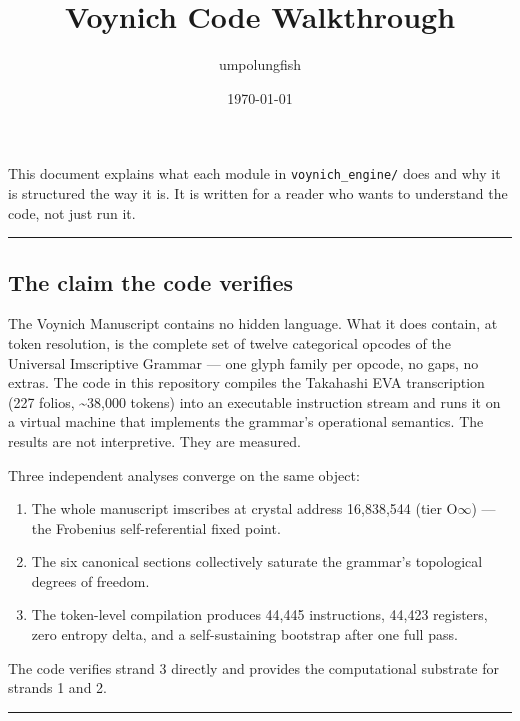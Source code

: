 \documentclass[12pt,a4paper]{article}
\begin{document}
\title{Voynich Code Walkthrough}
\author{umpolungfish}
\date{\today}

\maketitle

This document explains what each module in \texttt{voynich\_engine/} does and why it is structured the way it is. It is written for a reader who wants to understand the code, not just run it.

\begin{center}
\rule{0.5\textwidth}{0.4pt}
\end{center}

\subsection{The claim the code verifies}

The Voynich Manuscript contains no hidden language. What it does contain, at token resolution, is the complete set of twelve categorical opcodes of the Universal Imscriptive Grammar --- one glyph family per opcode, no gaps, no extras. The code in this repository compiles the Takahashi EVA transcription (227 folios, \textasciitilde{}38,000 tokens) into an executable instruction stream and runs it on a virtual machine that implements the grammar's operational semantics. The results are not interpretive. They are measured.

Three independent analyses converge on the same object:

\begin{enumerate}
    \item The whole manuscript imscribes at crystal address 16,838,544 (tier O$\infty$) --- the Frobenius self-referential fixed point.
    \item The six canonical sections collectively saturate the grammar's topological degrees of freedom.
    \item The token-level compilation produces 44,445 instructions, 44,423 registers, zero entropy delta, and a self-sustaining bootstrap after one full pass.
\end{enumerate}

The code verifies strand 3 directly and provides the computational substrate for strands 1 and 2.

\begin{center}
\rule{0.5\textwidth}{0.4pt}
\end{center}
\end{document}
